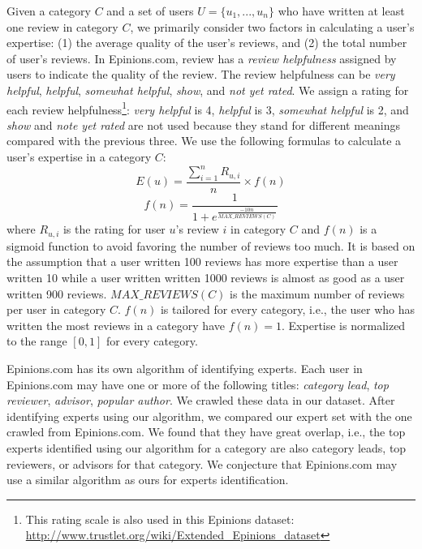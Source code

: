 \documentclass[12pt]{article}
\begin{document}
Given a category $C$ and a set of users $U = \{{u_{1}, ..., u_{n}}\}$ who have written at least one review in category $C$, we primarily consider two factors in calculating a user's expertise: (1) the average quality of the user's reviews, and (2) the total number of user's reviews. In Epinions.com, review has a \emph{review helpfulness} assigned by users to indicate the quality of the review. The review helpfulness can be \emph{very helpful}, \emph{helpful}, \emph{somewhat helpful}, \emph{show}, and \emph{not yet rated}. We assign a rating for each review helpfulness\footnote{This rating scale is also used in this Epinions dataset: \url{http://www.trustlet.org/wiki/Extended_Epinions_dataset}}: \emph{very helpful} is 4, \emph{helpful} is 3, \emph{somewhat helpful} is 2, and \emph{show} and \emph{note yet rated} are not used because they stand for different meanings compared with the previous three. We use the following formulas to calculate a user's expertise in a category $C$:
\begin{equation}
E(u) = \frac{\sum_{i=1}^n R_{u, i}} {n} \times f(n)
\end{equation}
\begin{equation}
f(n) = \frac{1}{1 + e^{\frac{-10n} {MAX\_REVIEWS(C)}}}
\end{equation}
where $R_{u, i}$ is the rating for user $u$'s review $i$ in category $C$ and $f(n)$ is a sigmoid function to avoid favoring the number of reviews too much. It is based on the assumption that a user written 100 reviews has more expertise than a user written 10 while a user written written 1000 reviews is almost as good as a user written 900 reviews. $MAX\_REVIEWS(C)$ is the maximum number of reviews per user in category $C$. $f(n)$ is tailored for every category, i.e., the user who has written the most reviews in a category have $f(n)=1$. Expertise is normalized to the range $[0,1]$ for every category.

Epinions.com has its own algorithm of identifying experts. Each user in Epinions.com may have one or more of the following titles: \emph{category lead}, \emph{top reviewer}, \emph{advisor}, \emph{popular author}. We crawled these data in our dataset. After identifying experts using our algorithm, we compared our expert set with the one crawled from Epinions.com. We found that they have great overlap, i.e., the top experts identified using our algorithm for a category are also category leads, top reviewers, or advisors for that category. We conjecture that Epinions.com may use a similar algorithm as ours for experts identification.
\end{document}
